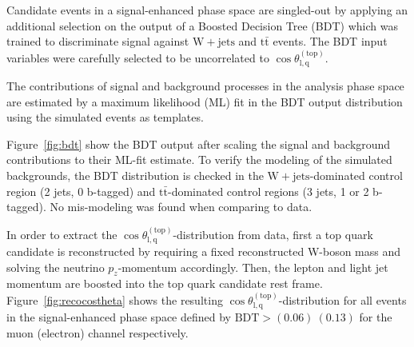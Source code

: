 \documentclass[a4paper]{jpconf}
\newcommand{\wjets}[0]{\mathrm{W+jets}}
\newcommand{\ttbar}[0]{\ensuremath{\mathrm{t\bar{t}}}}
\newcommand{\costheta}[0]{\cos\theta_{\mathrm{l,q}}^{\mathrm{(top)}}}
\newcommand{\BDT}[0]{\ensuremath{\mathrm{BDT}}}
\begin{document}
Candidate events in a signal-enhanced phase space are singled-out by applying an additional selection on the output of a Boosted Decision Tree (BDT) which was trained to discriminate signal against $\wjets$ and $\ttbar$ events. The BDT input variables were carefully selected to be uncorrelated to $\costheta$.


The contributions of signal and background processes in the analysis phase space are estimated by a maximum likelihood (ML) fit in the BDT output distribution using the simulated events as templates.


Figure~\ref{fig:bdt} show the BDT output after scaling the signal and background contributions to their ML-fit estimate. To verify the modeling of the simulated backgrounds, the BDT distribution is checked in the $\wjets$-dominated control region (2 jets, 0 b-tagged) and $\ttbar$-dominated control regions (3 jets, 1 or 2 b-tagged). No mis-modeling was found when comparing to data.


In order to extract the $\costheta$-distribution from data, first a top quark candidate is reconstructed by requiring a fixed reconstructed W-boson mass and solving the neutrino $p_{z}$-momentum accordingly. Then, the lepton and light jet momentum are boosted into the top quark candidate rest frame. Figure~\ref{fig:recocostheta} shows the resulting $\costheta$-distribution for all events in the signal-enhanced phase space defined by $\BDT>(0.06)~(0.13)$ for the muon (electron) channel respectively.
\end{document}
